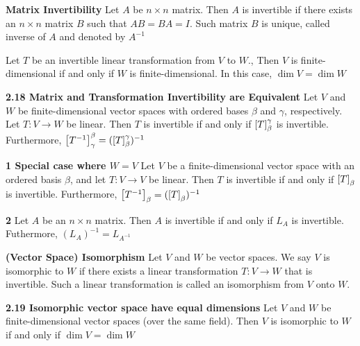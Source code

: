 \documentclass[11pt]{article}
\begin{document}
\begin{defn*}
    \textbf{Matrix Invertibility} Let $A$ be $n\times n$ matrix. Then $A$ is invertible if there exists an $n\times n$ matrix $B$ such that $AB = BA = I$. Such matrix $B$ is unique, called inverse of $A$ and denoted by $A^{-1}$
\end{defn*}

\begin{lemma*}
    Let $T$ be an invertible linear transformation from $V$ to $W$., Then $V$ is finite-dimensional if and only if $W$ is finite-dimensional. In this case, $\dim{V} = \dim{W}$
\end{lemma*}

\begin{theorem*}
    \textbf{2.18 Matrix and Transformation Invertibility are Equivalent} Let $V$ and $W$ be finite-dimensional vector spaces with ordered bases $\beta$ and $\gamma$, respectively. Let $T:V\to W$ be linear. Then $T$ is invertible if and only if $\left[ T \right]_{\beta}^{\gamma}$ is invertible. Furthermore, $\left[ T^{-1} \right]_{\gamma}^{\beta} = (\left[ T \right]_{\beta}^{\gamma})^{-1}$
\end{theorem*}

\begin{corollary*}
    \textbf{1 Special case where $W=V$} Let $V$ be a finite-dimensional vector space with an ordered basis $\beta$, and let $T:V\to V$ be linear. Then $T$ is invertible if and only if $\left[ T \right]_{\beta}$ is invertible. Furthermore, $\left[ T^{-1} \right]_{\beta} = (\left[ T \right]_{\beta})^{-1}$
\end{corollary*}

\begin{corollary*}
    \textbf{2} Let $A$ be an $n\times n$ matrix. Then $A$ is invertible if and only if $L_A$ is invertible. Futhermore, $(L_A)^{-1} = L_{A^{-1}}$
\end{corollary*}

\begin{defn*}
    \textbf{(Vector Space) Isomorphism} Let $V$ and $W$ be vector spaces. We say $V$ is isomorphic to $W$ if there exists a linear transformation $T:V\to W$ that is invertible. Such a linear transformation is called an isomorphism from $V$ onto $W$. 
\end{defn*}


\begin{theorem*}
    \textbf{2.19 Isomorphic vector space have equal dimensions} Let $V$ and $W$ be finite-dimensional vector spaces (over the same field). Then $V$ is isomorphic to $W$ if and only if $\dim{V} = \dim{W}$ 
\end{theorem*}
\end{document}

